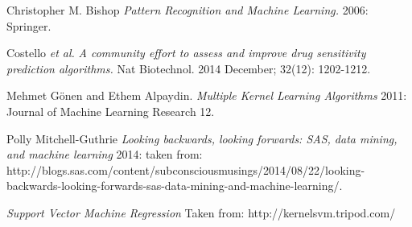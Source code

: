 \documentclass[paper=a4, fontsize=11pt]{scrartcl} %
\numberwithin{equation}{section} %
\numberwithin{figure}{section} %
\numberwithin{table}{section} %
\begin{document}



\newpage


\begin{thebibliography}{1}

   Christopher M. Bishop {\em Pattern Recognition and Machine Learning.}  2006: Springer.


   Costello \textit{et al.} {\em A community effort to assess and improve drug sensitivity prediction algorithms.} Nat Biotechnol. 2014 December; 32(12): 1202-1212.


   Mehmet G{\"o}nen and Ethem Alpaydin. {\em Multiple Kernel Learning Algorithms} 2011: Journal of Machine Learning Research 12.

   Polly Mitchell-Guthrie {\em Looking backwards, looking forwards: SAS, data mining, and machine learning} 2014: taken from: \\ http://blogs.sas.com/content/subconsciousmusings/2014/08/22/looking-backwards-looking-forwards-sas-data-mining-and-machine-learning/.

   {\em Support Vector Machine Regression} Taken from:
  http://kernelsvm.tripod.com/

  


\end{thebibliography}
\end{document}
